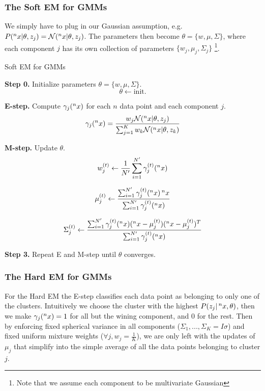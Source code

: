 \documentclass{article}
\begin{document}

\subsubsection{The Soft EM for GMMs}
We simply have to plug in our Gaussian assumption, e.g. $P( \prescript{n}{}{x} | \theta, z_j) = \mathcal{N}(\prescript{n}{}{x}|\theta, z_j)$. The parameters then become $\theta = \{w, \mu, \Sigma\}$, where each component $j$ has its own collection of parameters $\{w_j, \mu_j, \Sigma_j\}$ \footnote{Note that we assume each component to be multivariate Gaussian}. 

\begin{algorithm}
\caption{Soft EM for GMMs} \label{soft_em}
\begin{algorithmic}
\State \textbf{Step 0.} Initialize parameters $\theta = \{w, \mu, \Sigma\}$.
$$
\theta \leftarrow \text{init.}
$$

\State \textbf{E-step.} Compute $\gamma_j(\prescript{n}{}{x})$ for each \(n\) data point and each component \(j\).
$$
\gamma_j(\prescript{n}{}{x}) = \frac{w_j\mathcal{N}(\prescript{n}{}{x}|\theta, z_j)}{\sum_{j=1}^K w_k \mathcal{N}(\prescript{n}{}{x}|\theta, z_k)}
$$

\State \textbf{M-step.} Update $\theta$.
\[
w_j^{(t)} \leftarrow \frac{1}{N'} \sum_{i=1}^{N'} \gamma_j^{(t)}(\prescript{n}{}{x}) 
\]

\[
\mu_j^{(t)} \leftarrow \frac{\sum_{i=1}^{N'} \gamma_j^{(t)}(\prescript{n}{}{x})\prescript{n}{}{x}}{\sum_{i=1}^{N'} \gamma_j^{(t)}(\prescript{n}{}{x})}
\]

\[
\Sigma_j^{(t)} \leftarrow \frac{\sum_{i=1}^{N'} \gamma_j^{(t)}(\prescript{n}{}{x})(\prescript{n}{}{x}-\mu_j^{(t)})(\prescript{n}{}{x}-\mu_j^{(t)})^T}{\sum_{i=1}^{N'} \gamma_j^{(t)}(\prescript{n}{}{x})}
\]

\State \textbf{Step 3.} Repeat E and M-step until \(\theta\) converges.
\end{algorithmic}
\end{algorithm}

\subsubsection{The Hard EM for GMMs}

For the Hard EM the E-step classifies each data point as belonging to
only one of the clusters. Intuitively we choose the cluster with the highest $P (z_j | \prescript{n}{}{x}, \theta)$, then we make $\gamma_j(\prescript{n}{}{x}) = 1$ for all but the wining component, and 0 for the rest. Then by enforcing fixed
spherical variance in all components ($\Sigma_1,...,\Sigma_K = I\sigma$) and fixed uniform mixture weights ($\forall j, w_j = \frac{1}{K}$), we are only left with the updates of $\mu_j$ that simplify into the simple average of all the data points belonging to cluster $j$.
\end{document}
